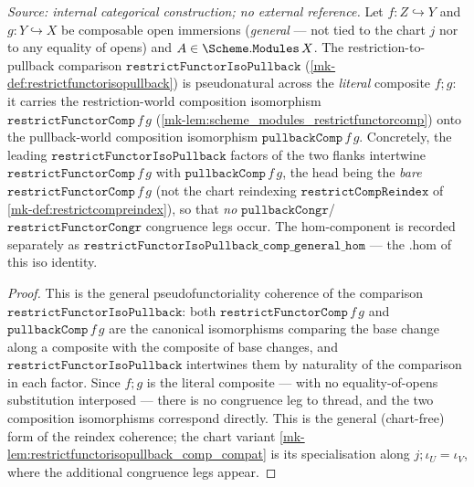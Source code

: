\begin{lemma}\label{mk-lem:restrictfunctorisopullback_comp_general}
  \leanok

  \textit{Source: internal categorical construction; no external reference.}
  Let \(f : Z \hookrightarrow Y\) and \(g : Y \hookrightarrow X\) be composable open immersions
  (\emph{general} --- not tied to the chart \(j\) nor to any equality of opens) and
  \(A \in \Scheme.\mathtt{Modules}\,X\). The restriction-to-pullback comparison
  \(\mathtt{restrictFunctorIsoPullback}\) (\ref{mk-def:restrictfunctorisopullback}) is pseudonatural
  across the \emph{literal} composite \(f \mathbin{;} g\): it carries the restriction-world
  composition isomorphism \(\mathtt{restrictFunctorComp}\,f\,g\)
  (\ref{mk-lem:scheme_modules_restrictfunctorcomp}) onto the pullback-world composition isomorphism
  \(\mathtt{pullbackComp}\,f\,g\). Concretely, the leading
  \(\mathtt{restrictFunctorIsoPullback}\) factors of the two flanks intertwine
  \(\mathtt{restrictFunctorComp}\,f\,g\) with \(\mathtt{pullbackComp}\,f\,g\), the head being the
  \emph{bare} \(\mathtt{restrictFunctorComp}\,f\,g\) (not the chart reindexing
  \(\mathtt{restrictCompReindex}\) of \ref{mk-def:restrictcompreindex}), so that \emph{no}
  \(\mathtt{pullbackCongr}\)/\(\mathtt{restrictFunctorCongr}\) congruence legs occur. The
  \(\mathrm{hom}\)-component is recorded separately as
  \(\mathtt{restrictFunctorIsoPullback\_comp\_general\_hom}\) --- the \(.\mathrm{hom}\) of this iso
  identity.
\end{lemma}
\begin{proof}
  \leanok
  This is the general pseudofunctoriality coherence of the comparison
  \(\mathtt{restrictFunctorIsoPullback}\): both \(\mathtt{restrictFunctorComp}\,f\,g\) and
  \(\mathtt{pullbackComp}\,f\,g\) are the canonical isomorphisms comparing the base change along a
  composite with the composite of base changes, and \(\mathtt{restrictFunctorIsoPullback}\)
  intertwines them by naturality of the comparison in each factor. Since \(f \mathbin{;} g\) is the
  literal composite --- with no equality-of-opens substitution interposed --- there is no congruence
  leg to thread, and the two composition isomorphisms correspond directly. This is the general
  (chart-free) form of the reindex coherence; the chart variant
  \ref{mk-lem:restrictfunctorisopullback_comp_compat} is its specialisation along
  \(j \mathbin{;} \iota_U = \iota_V\), where the additional congruence legs appear.
\end{proof}

